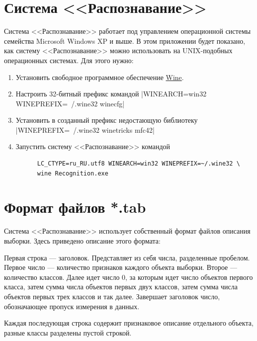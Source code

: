 \documentclass[12pt]{article}
\begin{document}
\appendix
\section{Система <<Распознавание>>}
Система <<Распознавание>> \cite{recognition06} работает под
управлением операционной системы семейства Microsoft Windows XP и
выше. В этом приложении будет показано, как систему <<Распознавание>>
можно использовать на UNIX-подобных операционных системах. Для этого
нужно:

\begin{enumerate}
  \item Установить свободное программное обеспечение
    \href{https://www.winehq.org/}{Wine}.
  \item Настроить 32-битный префикс командой
    |WINEARCH=win32 WINEPREFIX=~/.wine32 winecfg|
  \item Установить в созданный префикс недостающую библиотеку
    |WINEPREFIX=~/.wine32 winetricks mfc42|
  \item Запустить систему <<Распознавание>> командой
    \begin{verbatim}
      LC_CTYPE=ru_RU.utf8 WINEARCH=win32 WINEPREFIX=~/.wine32 \
      wine Recognition.exe
    \end{verbatim}
\end{enumerate}

\section{Формат файлов *.tab}

Система <<Распознавание>> \cite{recognition06} использует собственный
формат файлов описания выборки. Здесь приведено описание этого
формата:

Первая строка --- заголовок. Представляет из себя числа, разделенные
пробелом. Первое число --- количество признаков каждого объекта
выборки. Второе --- количество классов. Далее идет число \(0\), за
которым идет число объектов первого класса, затем сумма числа объектов
первых двух классов, затем сумма числа объектов первых трех классов и
так далее. Завершает заголовок число, обозначающее пропуск измерения в
данных.

Каждая последующая строка содержит признаковое описание отдельного
объекта, разные классы разделены пустой строкой.

\printbibliography
\end{document}
